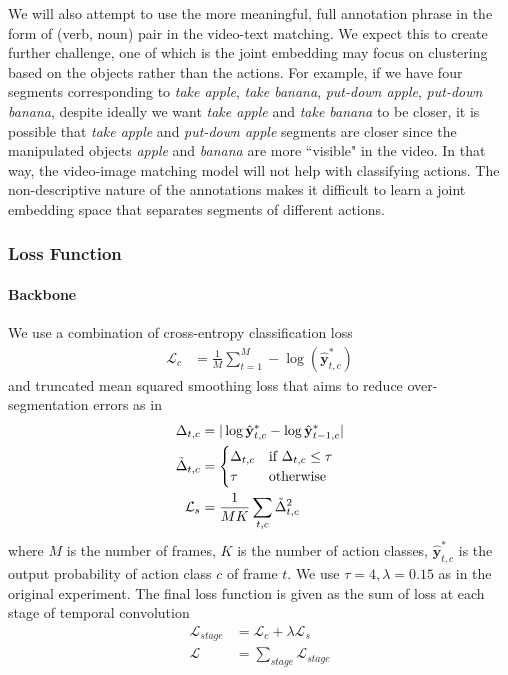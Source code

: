 We will also attempt to use the more meaningful, full annotation phrase in the form of (verb, noun) pair in the video-text matching. We expect this to create further challenge, one of which is the joint embedding may focus on clustering based on the objects rather than the actions. For example, if we have four segments corresponding to \textit{take apple}, \textit{take banana}, \textit{put-down apple}, \textit{put-down banana}, despite ideally we want \textit{take apple} and \textit{take banana} to be closer, it is possible that \textit{take apple} and \textit{put-down apple} segments are closer since the manipulated objects \textit{apple} and \textit{banana} are more ``visible" in the video. In that way, the video-image matching model will not help with classifying actions. The non-descriptive nature of the annotations makes it difficult to learn a joint embedding space that separates segments of different actions.

\subsubsection{Loss Function}
\paragraph{Backbone} We use a combination of cross-entropy classification loss
\begin{align*}
    \mathcal{L}_c&=\frac{1}{M}\sum_{t=1}^M-\log(\hat{\mathbf{y}}^*_{t,c})
\end{align*}
and truncated mean squared smoothing loss that aims to reduce over-segmentation errors as in \cite{8953830}
\begin{align*}
    \Delta_{t,c}&=|\log\hat{\mathbf{y}}^*_{t,c}-\log\hat{\mathbf{y}}^*_{t-1,c}|\\
    \Tilde{\Delta}_{t,c}&=\begin{cases}\Delta_{t,c} &\text{if $\Delta_{t,c}\le\tau$}\\\tau &\text{otherwise}\end{cases}\\
    \mathcal{L}_s&=\frac{1}{MK}\sum_{t,c}\Tilde{\Delta}^2_{t,c}
 \end{align*}
where $M$ is the number of frames, $K$ is the number of action classes, $\hat{\mathbf{y}}^*_{t,c}$ is the output probability of action class $c$ of frame $t$. We use $\tau=4,\lambda=0.15$ as in the original experiment. The final loss function is given as the sum of loss at each stage of temporal convolution
\begin{align*}
    \mathcal{L}_{stage}&=\mathcal{L}_c+\lambda\mathcal{L}_s\\
    \mathcal{L}&=\sum_{stage}\mathcal{L}_{stage}
\end{align*}

